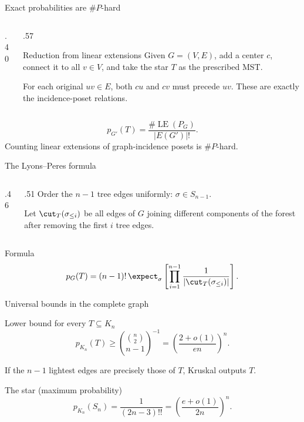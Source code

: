 \begin{frame}{Exact probabilities are \(\#P\)-hard}
 \begin{columns}[c,onlytextwidth]
  \begin{column}{.40\textwidth}
   \begin{center}\resizebox{.74\linewidth}{!}{\StarHardnessFig}\end{center}
  \end{column}
  \begin{column}{.57\textwidth}
   \begin{block}{Reduction from linear extensions}
   Given \(G=(V,E)\), add a center \(c\), connect it to all \(v\in V\), and take the star \(T\) as the prescribed MST.
   \end{block}
    For each original \(uv\in E\), both \(cu\) and \(cv\) must precede \(uv\).
   These are exactly the incidence-poset relations.
  \end{column}
 \end{columns}
 \[p_{G'}(T)=\frac{\#\operatorname{LE}(P_G)}{|E(G')|!}.\]
 \small Counting linear extensions of graph-incidence posets is \(\#P\)-hard.
\end{frame}


\begin{frame}{The Lyons--Peres formula}
 \begin{columns}[c,onlytextwidth]
  \begin{column}{.46\textwidth}
   \begin{center}\resizebox{\linewidth}{!}{\FundamentalCutFig}\end{center}
  \end{column}
  \begin{column}{.51\textwidth}
   Order the \(n-1\) tree edges uniformly: \(\sigma\in S_{n-1}\).

   Let \(\cut_T(\sigma_{\le i})\) be all edges of \(G\) joining different components of the forest after removing the first \(i\) tree edges.
  \end{column}
 \end{columns}
 \begin{block}{Formula}
 \[p_G(T)=(n-1)!\,\expect_{\sigma}\left[\prod_{i=1}^{n-1}\frac1{|\cut_T(\sigma_{\le i})|}\right].\]
 \end{block}
\end{frame}


\begin{frame}{Universal bounds in the complete graph}
 \begin{block}{Lower bound for every \(T\subseteq K_n\)}
 \[p_{K_n}(T)\ge\binom{\binom n2}{n-1}^{-1}
 =\left(\frac{2+o(1)}{en}\right)^n.\]
 \end{block}
  If the \(n-1\) lightest edges are precisely those of \(T\), Kruskal outputs \(T\).
 \vspace{.22cm}
 \begin{block}{The star (maximum probability)}
 \[p_{K_n}(S_n)=\frac1{(2n-3)!!}
 =\left(\frac{e+o(1)}{2n}\right)^n.\]
 \end{block}
\end{frame}


